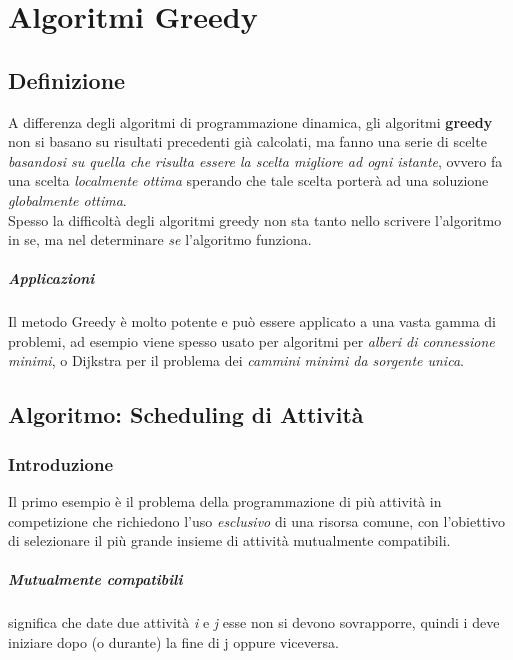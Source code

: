 \documentclass[12pt, a4paper, openany]{book}
\begin{document}
\chapter{Algoritmi Greedy}
\section{Definizione}
A differenza degli algoritmi di programmazione dinamica, gli algoritmi \textbf{greedy} non si basano su risultati precedenti già calcolati, ma fanno una serie di scelte \emph{basandosi su quella che risulta essere la scelta migliore ad ogni istante}, ovvero fa una scelta \emph{localmente ottima} sperando che tale scelta porterà ad una soluzione \emph{globalmente ottima}.
\\Spesso la difficoltà degli algoritmi greedy non sta tanto nello scrivere l'algoritmo in se, ma nel determinare \emph{se} l'algoritmo funziona.
\paragraph{Applicazioni}
Il metodo Greedy è molto potente e può essere applicato a una vasta gamma di problemi, ad esempio viene spesso usato per algoritmi per \emph{alberi di connessione minimi}, o Dijkstra per il problema dei \emph{cammini minimi da sorgente unica}.

\section{Algoritmo: Scheduling di Attività}

\subsection*{Introduzione}
Il primo esempio è il problema della programmazione di più attività in competizione che richiedono l'uso \emph{esclusivo} di una risorsa comune, con l'obiettivo di selezionare il più grande insieme di attività mutualmente compatibili.
\paragraph{Mutualmente compatibili} significa che date due attività \emph{i} e \emph{j} esse non si devono sovrapporre, quindi i deve iniziare dopo (o durante) la fine di j oppure viceversa.
\end{document}
